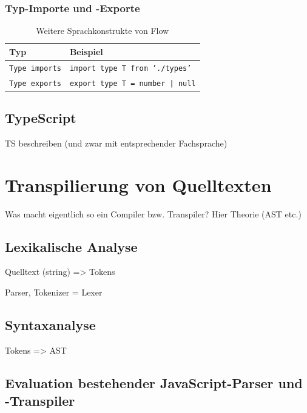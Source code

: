 \subsubsection{Typ-Importe und -Exporte}

\begin{table}[tbp]
  \footnotesize
  \begin{tabularx}{\textwidth}{@{}ll@{}}
    \midrule
    \textbf{Typ}               & \textbf{Beispiel}                      \\
    \midrule
    \texttt{Type imports}     & \texttt{import type T from './types'}   \\
    \texttt{Type exports}     & \texttt{export type T = number | null}  \\
    \midrule
  \end{tabularx}
  \caption{Weitere Sprachkonstrukte von Flow}
  \label{tab:flow-other-constructs}
\end{table}


\subsection{TypeScript}
  TS beschreiben (und zwar mit entsprechender Fachsprache)

\section{Transpilierung von Quelltexten}

  Was macht eigentlich so ein Compiler bzw. Transpiler? Hier Theorie (AST etc.)

\subsection{Lexikalische Analyse}

  Quelltext (string) => Tokens

  Parser, Tokenizer = Lexer

\subsection{Syntaxanalyse}

  Tokens => AST

\subsection{Evaluation bestehender JavaScript-Parser und -Transpiler}
\label{subsec:js-transpilers}

